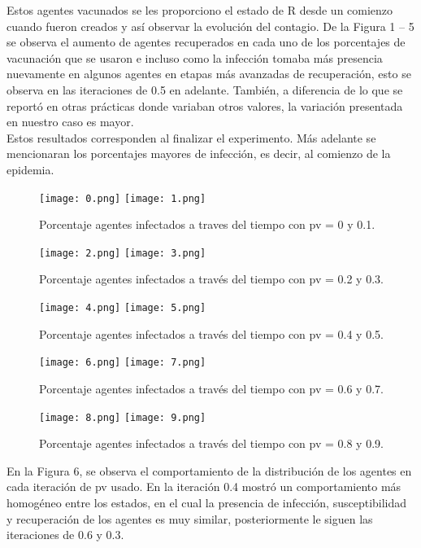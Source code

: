 \documentclass{article}
\begin{document}
Estos agentes vacunados se les proporciono el estado de R desde un comienzo cuando fueron creados y así observar la evolución del contagio. De la Figura 1 – 5 se observa el aumento de agentes recuperados en cada uno de los porcentajes de vacunación que se usaron e incluso como la infección tomaba más presencia nuevamente en algunos agentes en etapas más avanzadas de recuperación, esto se observa en las iteraciones de 0.5 en adelante. También, a diferencia de lo que se reportó en otras prácticas \cite{REF2} donde variaban otros valores, la variación presentada en nuestro caso es mayor. \\Estos resultados corresponden al finalizar el experimento. Más adelante se mencionaran los porcentajes mayores de infección, es decir, al comienzo de la epidemia.
\begin{figure}[H]
\texttt{[image: 0.png]}                   \texttt{[image: 1.png]} 
\caption{Porcentaje agentes infectados a traves del tiempo con pv = 0 y 0.1.}
\end{figure}
\begin{figure}[H]
\texttt{[image: 2.png]}           \texttt{[image: 3.png]} 
\caption{Porcentaje agentes infectados a través del tiempo con pv = 0.2 y 0.3.}
\end{figure}
\begin{figure}[H]
\texttt{[image: 4.png]}           \texttt{[image: 5.png]} 
\caption{Porcentaje agentes infectados a través del tiempo con pv = 0.4 y 0.5.}
\end{figure}
\begin{figure}[H]
\texttt{[image: 6.png]}           \texttt{[image: 7.png]} 
\caption{Porcentaje agentes infectados a través del tiempo con pv = 0.6 y 0.7.}
\end{figure}
\begin{figure}[H]
\texttt{[image: 8.png]}           \texttt{[image: 9.png]} 
\caption{Porcentaje agentes infectados a través del tiempo con pv = 0.8 y 0.9.}
\end{figure}
En la Figura 6, se observa el comportamiento de la distribución de los agentes en cada iteración de pv usado. En la iteración 0.4 mostró un comportamiento más homogéneo entre los estados, en el cual la presencia de infección, susceptibilidad y recuperación de los agentes es muy similar, posteriormente le siguen las iteraciones de 0.6 y 0.3. 
\end{document}
